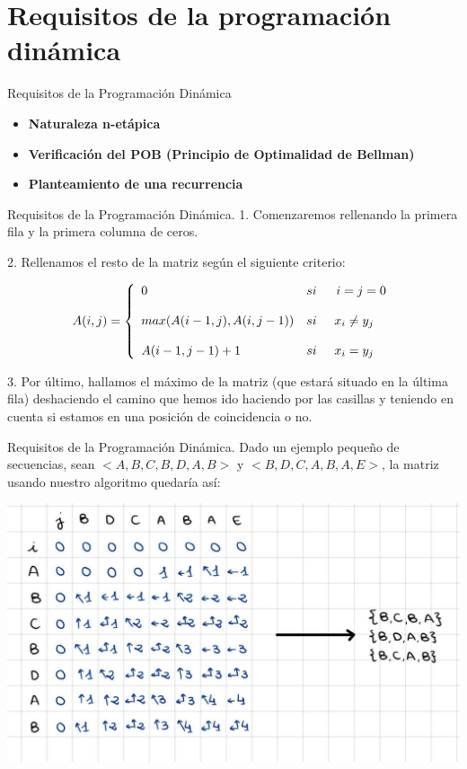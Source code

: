 \documentclass[10pt, xcolor=table]{beamer}
\begin{document}
\section{Requisitos de la programación dinámica}
\begin{frame}[fragile]{Requisitos de la Programación Dinámica}
	\begin{itemize}
		\item \textbf{Naturaleza n-etápica}
		\item \textbf{Verificación del POB (Principio de Optimalidad de Bellman)}
		\item \textbf{Planteamiento de una recurrencia}
	\end{itemize}
\end{frame}

\begin{frame}[fragile]{Requisitos de la Programación Dinámica. }
	1. Comenzaremos rellenando la primera fila y la primera columna de ceros.
	
	2. Rellenamos el resto de la matriz según el siguiente criterio:
	
\[
	A(i,j)= \left\{ \begin{array}{lcc}
		0 &   si  &  \hspace{0.2cm} i=j=0 \\
		\\ max(A(i-1,j),A(i,j-1)) &  si  & x_i \neq y_j \hspace{0.2cm}\\
		\\ A(i-1,j-1) + 1 & si & x_i = y_j \hspace{0.2cm}
	\end{array}
	\right.
	\]
	
	3. Por último, hallamos el máximo de la matriz (que estará situado en la última fila) deshaciendo el camino que hemos ido haciendo por las casillas y teniendo en cuenta si estamos en una posición de coincidencia o no.
\end{frame}

	
\begin{frame}[fragile]{Requisitos de la Programación Dinámica. }
	Dado un ejemplo pequeño de secuencias, sean $<A,B,C,B,D,A,B>$ y $<B,D,C,A,B,A,E>$, la matriz usando nuestro algoritmo quedaría así:
	
	\begin{center}
		\includegraphics[scale=0.23]{./Ejemplo.png}
	\end{center}
\end{frame}
\end{document}
